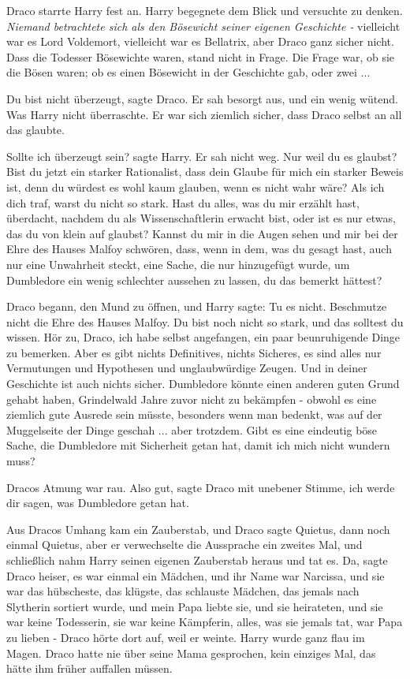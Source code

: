 Draco starrte Harry fest an. Harry begegnete dem Blick und versuchte zu denken.
\emph{Niemand betrachtete sich als den Bösewicht seiner eigenen Geschichte -}
vielleicht war es Lord Voldemort, vielleicht war es Bellatrix, aber Draco ganz
sicher nicht. Dass die Todesser Bösewichte waren, stand nicht in Frage. Die
Frage war, ob sie die Bösen waren; ob es einen Bösewicht in der Geschichte gab,
oder zwei ...

\glqq{}Du bist nicht überzeugt\grqq{}, sagte Draco. Er sah besorgt aus, und ein
wenig wütend. Was Harry nicht überraschte. Er war sich ziemlich sicher, dass
Draco selbst an all das glaubte.

\glqq{}Sollte ich überzeugt sein?\grqq{} sagte Harry. Er sah nicht weg. \glqq{}Nur
weil du es glaubst? Bist du jetzt ein starker Rationalist, dass dein Glaube für
mich ein starker Beweis ist, denn du würdest es wohl kaum glauben, wenn es nicht
wahr wäre? Als ich dich traf, warst du nicht so stark. Hast du alles, was du mir
erzählt hast, überdacht, nachdem du als Wissenschaftlerin erwacht bist, oder ist
es nur etwas, das du von klein auf glaubst? Kannst du mir in die Augen sehen und
mir bei der Ehre des Hauses Malfoy schwören, dass, wenn in dem, was du gesagt
hast, auch nur eine Unwahrheit steckt, eine Sache, die nur hinzugefügt wurde, um
Dumbledore ein wenig schlechter aussehen zu lassen, du das bemerkt
hättest?\grqq{}

Draco begann, den Mund zu öffnen, und Harry sagte: \glqq{}Tu es nicht. Beschmutze
nicht die Ehre des Hauses Malfoy. Du bist noch nicht so stark, und das solltest
du wissen. Hör zu, Draco, ich habe selbst angefangen, ein paar beunruhigende
Dinge zu bemerken. Aber es gibt nichts Definitives, nichts Sicheres, es sind
alles nur Vermutungen und Hypothesen und unglaubwürdige Zeugen. Und in deiner
Geschichte ist auch nichts sicher. Dumbledore könnte einen anderen guten Grund
gehabt haben, Grindelwald Jahre zuvor nicht zu bekämpfen - obwohl es eine
ziemlich gute Ausrede sein müsste, besonders wenn man bedenkt, was auf der
Muggelseite der Dinge geschah ... aber trotzdem. Gibt es eine eindeutig böse
Sache, die Dumbledore mit Sicherheit getan hat, damit ich mich nicht wundern
muss?\grqq{}

Dracos Atmung war rau. \glqq{}Also gut\grqq{}, sagte Draco mit unebener Stimme,
\glqq{}ich werde dir sagen, was Dumbledore getan hat.\grqq{}

Aus Dracos Umhang kam ein Zauberstab, und Draco sagte \glqq{}Quietus\grqq{}, dann
noch einmal \glqq{}Quietus\grqq{}, aber er verwechselte die Aussprache ein
zweites Mal, und schließlich nahm Harry seinen eigenen Zauberstab heraus und tat
es. \glqq{}Da\grqq{}, sagte Draco heiser, \glqq{}es war einmal ein Mädchen, und
ihr Name war Narcissa, und sie war das hübscheste, das klügste, das schlauste
Mädchen, das jemals nach Slytherin sortiert wurde, und mein Papa liebte sie,
und sie heirateten, und sie war keine Todesserin, sie war keine Kämpferin,
alles, was sie jemals tat, war Papa zu lieben -\grqq{} Draco hörte dort auf,
weil er weinte. Harry wurde ganz flau im Magen. Draco hatte nie über seine
Mama gesprochen, kein einziges Mal, das hätte ihm früher auffallen müssen.

